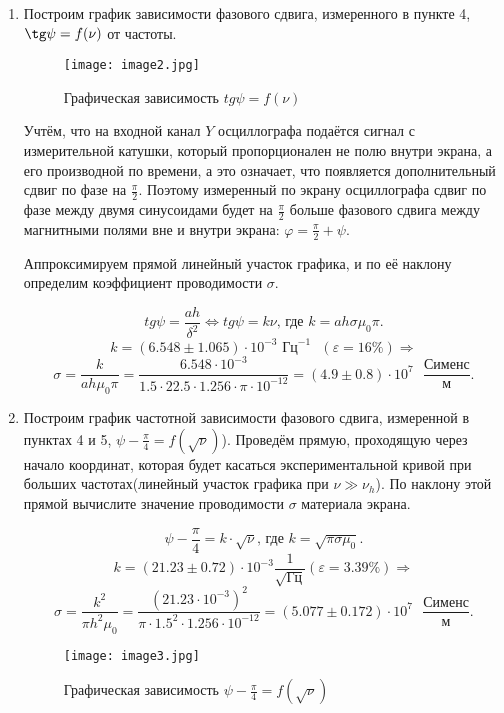 \documentclass[a4paper,12pt]{article} %
\begin{document}
\begin{enumerate}
    \item Построим график зависимости фазового сдвига, измеренного в пункте 4, $\tg \psi = f(\nu)$ от частоты. 

    \begin{figure}[!h]
        \centering
        \texttt{[image: image2.jpg]}
        \caption{Графическая зависимость $tg \psi=f(\nu)$}
        \label{graf1}
    \end{figure}

    Учтём, что на входной канал $Y$ осциллографа подаётся сигнал с измерительной катушки, который пропорционален не полю внутри экрана,
    а его производной по времени, а это означает, что появляется дополнительный сдвиг по фазе на $\frac{\pi}{2}$. Поэтому измеренный по экрану осциллографа сдвиг по фазе между двумя синусоидами будет на $\frac{\pi}{2}$ больше фазового сдвига между магнитными полями вне и внутри экрана: $\varphi = \frac{\pi}{2} + \psi$.

    Аппроксимируем прямой линейный участок графика, и по её наклону определим коэффициент проводимости $\sigma$.

    \[ tg \psi = \frac{ah}{\delta^2} \Leftrightarrow tg \psi = k\nu \text{, где } k = ah\sigma\mu_0\pi. \]
    \[ k = (6.548 \pm 1.065) \cdot 10^{-3} \text{ Гц}^{-1} \text{ }(\varepsilon = 16 \%) \Longrightarrow \] \[ \sigma = \frac{k}{ah\mu_0\pi} = \frac{6.548\cdot 10^{-3}}{1.5\cdot22.5\cdot1.256\cdot\pi\cdot10^{-12}} = (4.9 \pm 0.8) \cdot 10^{7}\text{ }\frac{\text{Сименс}}{\text{м}}.  \]

    \item Построим график частотной зависимости фазового сдвига, измеренной в пунктах 4 и 5, $\psi - \frac{\pi}{4} = f(\sqrt{\nu})$).
    Проведём прямую, проходящую через начало координат, которая будет касаться экспериментальной кривой при больших частотах(линейный участок графика при $\nu \gg \nu_{h}$).
    По наклону этой прямой вычислите значение проводимости $\sigma$ материала экрана.

    \[ \psi - \frac{\pi}{4} = k\cdot\sqrt{\nu} \text{, где } k = \sqrt{\pi\sigma\mu_0}. \]
    \[ k = (21.23 \pm 0.72) \cdot 10^{-3} \frac{1}{\sqrt{\text{Гц}}} (\varepsilon = 3.39 \%) \Longrightarrow \] \[ \sigma = \frac{k^2}{\pi h^2\mu_0} = \frac{(21.23 \cdot 10^{-3})^2}{\pi \cdot 1.5^{2} \cdot 1.256 \cdot 10^{-12}} = (5.077 \pm 0.172) \cdot 10^{7}\text{ }\frac{\text{Сименс}}{\text{м}}. \]

    \begin{figure}[!h]
        \centering
        \texttt{[image: image3.jpg]}
        \caption{Графическая зависимость $\psi - \frac{\pi}{4} = f(\sqrt{\nu})$}
        \label{graf1}
    \end{figure}


\end{enumerate}
\end{document}
